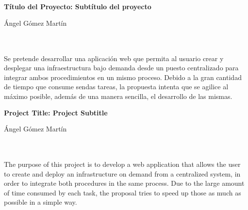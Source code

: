 

\cleardoublepage

\chapter*{}
\thispagestyle{empty}

\begin{center}
{\large\bfseries Título del Proyecto: Subtítulo del proyecto}\\
\end{center}
\begin{center}
Ángel Gómez Martín
\end{center}

\\

\vspace{0.7cm}
\\

Se pretende desarrollar una aplicación web que permita al usuario crear y desplegar una infraestructura bajo demanda desde un puesto centralizado para integrar ambos procedimientos en un mismo proceso. Debido a la gran cantidad de tiempo que consume sendas tareas, la propuesta intenta que se agilice al máximo posible, además de una manera sencilla, el desarrollo de las mismas.

\cleardoublepage
\thispagestyle{empty}

\begin{center}
{\large\bfseries Project Title: Project Subtitle}\\
\end{center}
\begin{center}
Ángel Gómez Martín
\end{center}

\\

\vspace{0.7cm}
\\

The purpose of this project is to develop a web application that allows the user to create and deploy an infrastructure on demand from a centralized system, in order to integrate both procedures in the same process. Due to the large amount of time consumed by each task, the proposal tries to speed up those as much as possible in a simple way.












